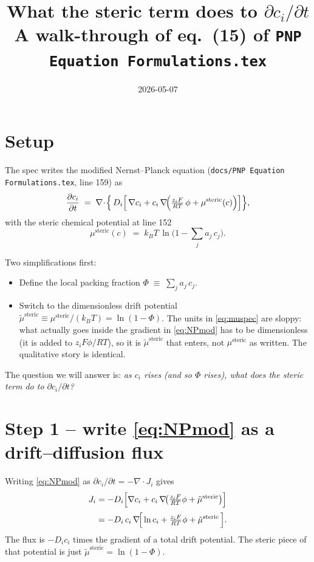 \documentclass[11pt]{article}
\title{What the steric term does to $\partial c_i/\partial t$\\
\large A walk-through of eq.~(15) of \texttt{PNP Equation Formulations.tex}}
\author{}
\date{2026-05-07}
\newcommand{\steric}{\mathrm{steric}}
\begin{document}
\maketitle

\section*{Setup}

The spec writes the modified Nernst--Planck equation
(\texttt{docs/PNP Equation Formulations.tex}, line 159) as
\begin{equation}
\label{eq:NPmod}
  \frac{\partial c_i}{\partial t}
  \;=\; \nabla\!\cdot\!\Bigl\{\, D_i \Bigl[\, \nabla c_i
        + c_i\, \nabla\!\Bigl(\tfrac{z_i F}{RT}\,\phi
                              + \mu^{\steric}(c)\Bigr)\Bigr]\Bigr\},
\end{equation}
with the steric chemical potential at line 152
\begin{equation}
\label{eq:muspec}
  \mu^{\steric}(c) \;=\; k_{B}T\, \ln\!\bigl(1 - \textstyle\sum_j a_j\, c_j\bigr).
\end{equation}

Two simplifications first:
\begin{itemize}
  \item Define the local packing fraction
        $\Phi \;\equiv\; \sum_j a_j\, c_j$.
  \item Switch to the dimensionless drift potential
        $\tilde\mu^{\steric} \equiv \mu^{\steric}/(k_{B}T) = \ln(1-\Phi)$.
        The units in \eqref{eq:muspec} are sloppy: what actually goes
        inside the gradient in \eqref{eq:NPmod} has to be dimensionless
        (it is added to $z_iF\phi/RT$), so it is $\tilde\mu^{\steric}$
        that enters, not $\mu^{\steric}$ as written. The qualitative
        story is identical.
\end{itemize}

The question we will answer is: \emph{as $c_i$ rises (and so $\Phi$
rises), what does the steric term do to $\partial c_i/\partial t$?}

\section{Step 1 -- write \eqref{eq:NPmod} as a drift--diffusion flux}

Writing \eqref{eq:NPmod} as $\partial c_i/\partial t = -\nabla\!\cdot J_i$
gives
\begin{align}
  J_i &= -D_i\Bigl[\nabla c_i
              + c_i\, \nabla\!\bigl(\tfrac{z_i F}{RT}\phi
                                   + \tilde\mu^{\steric}\bigr)\Bigr]
                                                       \nonumber \\[2pt]
      &= -D_i\, c_i\, \nabla\!\Bigl[\, \ln c_i
              + \tfrac{z_i F}{RT}\phi
              + \tilde\mu^{\steric}\,\Bigr].
  \label{eq:Jform}
\end{align}
The flux is $-D_i c_i$ times the gradient of a total drift potential.
The steric piece of that potential is just $\tilde\mu^{\steric} =
\ln(1-\Phi)$.
\end{document}
